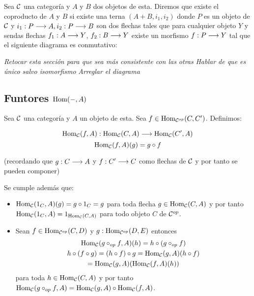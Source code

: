\begin{definition}
Sea $\mathcal{C}$ una categoría y $A$ y $B$ dos objetos de esta. Diremos que
existe el coproducto de $A$ y $B$
si existe una terna $(A+B, i_1, i_2)$
donde $P$ es un objeto de $\mathcal{C}$ y
$i_1 : P\longrightarrow A, i_2 : P\longrightarrow B$ son dos flechas tales
que para cualquier objeto $Y$ y sendas flechas $f_1 : A\longrightarrow Y$,
$f_2 : B\longrightarrow Y$ existe un morfismo
$f : P\longrightarrow Y$ tal que el siguiente diagrama es conmutativo:
\begin{center}
\end{center}
\end{definition}

\textit{Retocar esta sección para que sea más consistente con las otras}
\textit{Hablar de que es único salvo isomorfismo}
\textit{Arreglar el diagrama}

\subsection{Funtores $\operatorname{Hom}(-, A)$}
Sea $\mathcal{C}$ una categoría y $A$ un objeto de esta.
Sea $f \in \operatorname{Hom}_{\mathcal{C}^{op}}(C, C')$. Definimos:

$$\Hom_{\C}(f, A) :
  \arr{
    \Hom_{\C}(C, A)
  }{
    \Hom_{\C}(C', A)
  }$$
$$\operatorname{Hom}_{\mathcal{C}}(f, A)(g) = g \circ f$$

(recordando que $g : C\longrightarrow A$ y $f : C'\longrightarrow C$ como
flechas de $\mathcal{C}$ y por tanto se pueden componer)

Se cumple además que:

\begin{itemize}
\item $\operatorname{Hom}_{\mathcal{C}}(1_C, A)(g) = g \circ 1_C = g$ para toda flecha
  $g\in \operatorname{Hom}_{\mathcal{C}}(C, A)$ y por tanto
  $\operatorname{Hom}_{\mathcal{C}}(1_C, A) = 1_{\operatorname{Hom}_{\mathcal{C}}(C, A)}$ para todo objeto $C$
  de $\mathcal{C}^{op}$.

\item Sean $f \in \operatorname{Hom}_{\mathcal{C}^{op}}(C, D)$ y $g : \operatorname{Hom}_{\mathcal{C}^{op}}(D, E)$
  entonces
  \begin{multline*}
    $$\Hom_{\C}(g \circ_{op} f, A)(h) = h \circ (g \circ_{op} f) \\
      h \circ (f \circ g) = (h \circ f) \circ g = \Hom_{\C}(g, A)(h \circ f) \\
      = \Hom_{\C}(g, A)(\Hom_{\C}(f, A)(h))$$
  \end{multline*}
  para toda $h \in \operatorname{Hom}_{\mathcal{C}}(C, A)$ y por tanto
  $\operatorname{Hom}_{\mathcal{C}}(g \circ_{op} f, A) = \operatorname{Hom}_{\mathcal{C}}(g, A) \circ \operatorname{Hom}_{\mathcal{C}}(f, A)$.
\end{itemize}


